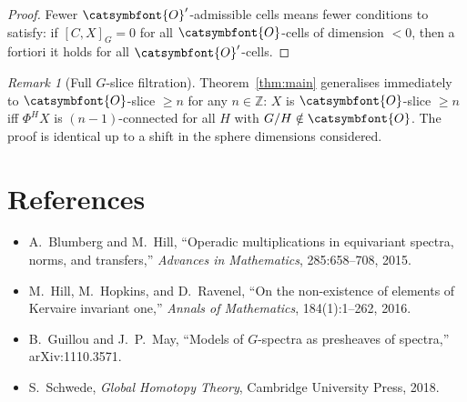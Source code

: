 \documentclass[12pt]{article}
\theoremstyle{definition}
\theoremstyle{remark}
\newtheorem{remark}[theorem]{Remark}
\newcommand{\aO}{{\catsymbfont{O}}}
\begin{document}
\begin{proof}
Fewer $\aO'$-admissible cells means fewer conditions to satisfy: if
$[C,X]_G = 0$ for all $\aO$-cells of dimension $<0$, then a fortiori it holds
for all $\aO'$-cells.
\end{proof}

\begin{remark}[Full $G$-slice filtration]
Theorem~\ref{thm:main} generalises immediately to $\aO$-slice $\geq n$ for any
$n\in\mathbb{Z}$: $X$ is $\aO$-slice $\geq n$ iff $\Phi^H X$ is
$(n-1)$-connected for all $H$ with $G/H\notin\aO$.  The proof is identical
up to a shift in the sphere dimensions considered.
\end{remark}

\section*{References}

\begin{itemize}
\item A.~Blumberg and M.~Hill, ``Operadic multiplications in equivariant spectra,
  norms, and transfers,'' \emph{Advances in Mathematics}, 285:658--708, 2015.
\item M.~Hill, M.~Hopkins, and D.~Ravenel, ``On the non-existence of elements
  of Kervaire invariant one,'' \emph{Annals of Mathematics}, 184(1):1--262, 2016.
\item B.~Guillou and J.~P.~May, ``Models of $G$-spectra as presheaves of spectra,''
  arXiv:1110.3571.
\item S.~Schwede, \emph{Global Homotopy Theory}, Cambridge University Press, 2018.
\end{itemize}
\end{document}
